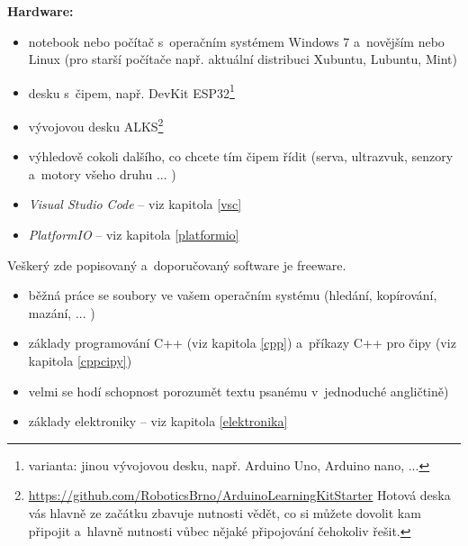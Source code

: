 {\bf Hardware: }

\begin{itemize} 
\item  notebook nebo počítač s~operačním systémem Windows 7 a~novějším nebo Linux (pro starší počítače např. aktuální distribuci Xubuntu, Lubuntu, Mint)
\item  desku s~čipem, např. DevKit ESP32\footnote{varianta: jinou vývojovou desku, např. Arduino Uno, Arduino nano, ...  }
\item  vývojovou desku ALKS\footnote{\url{https://github.com/RoboticsBrno/ArduinoLearningKitStarter}  %
Hotová deska vás hlavně ze začátku zbavuje nutnosti vědět, co si můžete dovolit kam připojit a~hlavně nutnosti vůbec nějaké připojování čehokoliv řešit. }
\item výhledově cokoli dalšího, co chcete tím čipem řídit (serva, ultrazvuk, senzory a~motory všeho druhu ... )
\end{itemize}

\begin{itemize} 
\item  {\it Visual Studio Code} -- viz kapitola \ref{vsc}
\item  {\it PlatformIO }-- viz kapitola \ref{platformio}
\end{itemize}
Veškerý zde popisovaný a~doporučovaný software je freeware.

\vspace*{1ex}

\begin{itemize} 
\item  běžná práce se soubory ve vašem operačním systému (hledání, kopírování, mazání, ... )
\item  základy programování C++ (viz kapitola \ref{cpp}) a~příkazy C++ pro čipy (viz kapitola \ref{cppcipy})
\item  velmi se hodí schopnost porozumět textu psanému v~jednoduché angličtině)
\item  základy elektroniky -- viz kapitola \ref{elektronika}
\end{itemize}

\vspace*{1ex}

